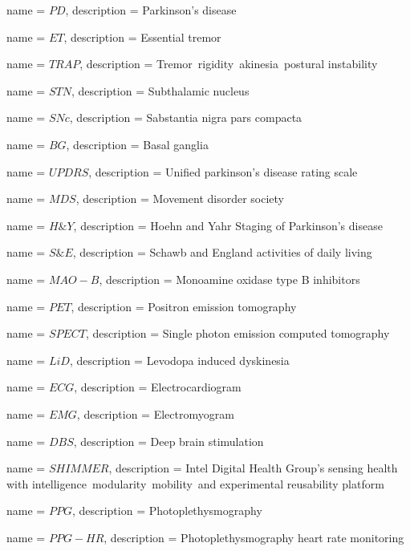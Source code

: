 {
	name = $PD$, 
	description = Parkinson’s disease
}

{
	name = $ET$, 
	description = Essential tremor
}

{
	name = $TRAP$, 
	description = Tremor\, rigidity\, akinesia\, postural instability
}

{
	name = $STN$, 
	description = Subthalamic nucleus
}

{
	name = $SNc$, 
	description = Sabstantia nigra pars compacta
}

{
	name = $BG$, 
	description = Basal ganglia
}

{
	name = $UPDRS$, 
	description = Unified parkinson’s disease rating scale
}

{
	name = $MDS$, 
	description = Movement disorder society
}

{
	name = $H\&Y$, 
	description = Hoehn and Yahr Staging of Parkinson's disease
}

{
	name = $S\&E$, 
	description = Schawb and England activities of daily living
}

{
	name = $MAO-B$, 
	description = Monoamine oxidase type B inhibitors
}

{
	name = $PET$, 
	description = Positron emission tomography
}

{
	name = $SPECT$, 
	description = Single photon emission computed tomography
}

{
	name = $LiD$, 
	description = Levodopa induced dyskinesia
}

{
	name = $ECG$, 
	description = Electrocardiogram
}

{
	name = $EMG$, 
	description = Electromyogram
}

{
	name = $DBS$, 
	description = Deep brain stimulation
}

{
	name = $SHIMMER$, 
	description = Intel Digital Health Group’s sensing health with intelligence\, modularity\, mobility\, and experimental reusability platform
}

{
	name = $PPG$, 
	description = Photoplethysmography
}

{
	name = $PPG-HR$, 
	description = Photoplethysmography heart rate monitoring
}

